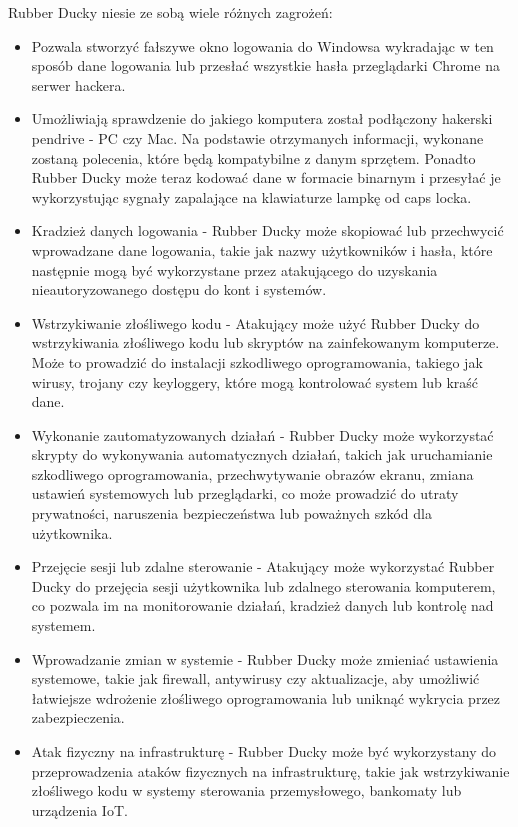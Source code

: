 \documentclass{article}
\begin{document}
Rubber Ducky niesie ze sobą wiele różnych zagrożeń:
\begin{itemize}
    \item Pozwala stworzyć fałszywe okno logowania do Windowsa wykradając w ten sposób dane logowania lub przesłać wszystkie hasła przeglądarki Chrome na serwer hackera. 
    \item Umożliwiają sprawdzenie do jakiego komputera został podłączony hakerski pendrive - PC czy Mac. Na podstawie otrzymanych informacji, wykonane zostaną polecenia, które będą kompatybilne z danym sprzętem. Ponadto Rubber Ducky może teraz kodować dane w formacie binarnym i przesyłać je wykorzystując sygnały zapalające na klawiaturze lampkę od caps locka.
    \item Kradzież danych logowania - Rubber Ducky może skopiować lub przechwycić wprowadzane dane logowania, takie jak nazwy użytkowników i hasła, które następnie mogą być wykorzystane przez atakującego do uzyskania nieautoryzowanego dostępu do kont i systemów.
    \item Wstrzykiwanie złośliwego kodu - Atakujący może użyć Rubber Ducky do wstrzykiwania złośliwego kodu lub skryptów na zainfekowanym komputerze. Może to prowadzić do instalacji szkodliwego oprogramowania, takiego jak wirusy, trojany czy keyloggery, które mogą kontrolować system lub kraść dane.
    \item Wykonanie zautomatyzowanych działań - Rubber Ducky może wykorzystać skrypty do wykonywania automatycznych działań, takich jak uruchamianie szkodliwego oprogramowania, przechwytywanie obrazów ekranu, zmiana ustawień systemowych lub przeglądarki, co może prowadzić do utraty prywatności, naruszenia bezpieczeństwa lub poważnych szkód dla użytkownika.
    \item  Przejęcie sesji lub zdalne sterowanie - Atakujący może wykorzystać Rubber Ducky do przejęcia sesji użytkownika lub zdalnego sterowania komputerem, co pozwala im na monitorowanie działań, kradzież danych lub kontrolę nad systemem.
    \item Wprowadzanie zmian w systemie - Rubber Ducky może zmieniać ustawienia systemowe, takie jak firewall, antywirusy czy aktualizacje, aby umożliwić łatwiejsze wdrożenie złośliwego oprogramowania lub uniknąć wykrycia przez zabezpieczenia.
    \item  Atak fizyczny na infrastrukturę - Rubber Ducky może być wykorzystany do przeprowadzenia ataków fizycznych na infrastrukturę, takie jak wstrzykiwanie złośliwego kodu w systemy sterowania przemysłowego, bankomaty lub urządzenia IoT.

    
\end{itemize} 
\end{document}
